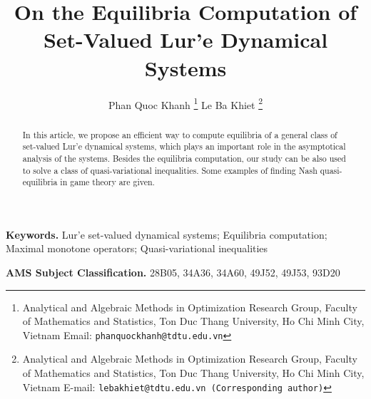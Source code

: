 \documentclass[11pt]{article}
\theoremstyle{plain}
\begin{document}
\title{ {On the Equilibria Computation of   Set-{{Valued}} Lur'e Dynamical Systems}}
\author{Phan Quoc Khanh \thanks{Analytical and Algebraic Methods in Optimization Research Group, Faculty of Mathematics and Statistics, Ton Duc Thang University, Ho Chi Minh City, Vietnam\vskip 0mm
Email: \texttt{phanquockhanh@tdtu.edu.vn}} \qquad 
 Le  Ba Khiet \thanks{Analytical and Algebraic Methods in Optimization Research Group, Faculty of Mathematics and Statistics, Ton Duc Thang University, Ho Chi Minh City, Vietnam\vskip 0mm
 E-mail: \texttt{lebakhiet@tdtu.edu.vn (Corresponding author)}}
 }
 
\maketitle


\begin{abstract}
In this article,   we propose an efficient  way to compute  equilibria of  a general class of set-valued Lur'e  dynamical systems, which plays an important role in the asymptotical analysis of the systems. Besides the equilibria computation, our study can be also used to solve a class of quasi-variational inequalities. Some examples of finding  Nash {quasi-equilibria} in game theory are given.
\end{abstract}


{\bf Keywords.}  Lur'e set-valued dynamical systems; Equilibria computation; Maximal monotone operators; Quasi-variational inequalities

{\bf AMS Subject Classification.} 28B05, 34A36, 34A60, 49J52, 49J53, 93D20
\end{document}
